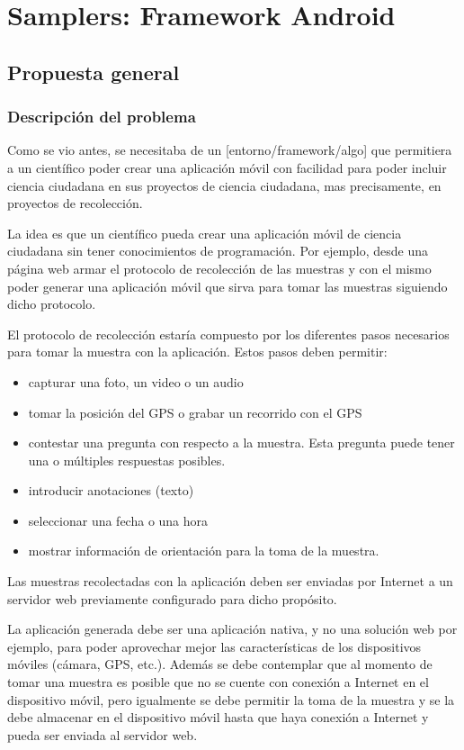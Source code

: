 \chapter{Samplers: Framework Android}

\section{Propuesta general}

\subsection{Descripción del problema}

Como se vio antes, se necesitaba de un [entorno/framework/algo] que permitiera a un científico poder crear una aplicación móvil con facilidad para poder incluir ciencia ciudadana en sus proyectos de ciencia ciudadana, mas precisamente, en proyectos de recolección.

La idea es que un científico pueda crear una aplicación móvil de ciencia ciudadana sin tener conocimientos de programación. Por ejemplo, desde una página web armar el protocolo de recolección de las muestras y con el mismo poder generar una aplicación móvil que sirva para tomar las muestras siguiendo dicho protocolo.

El protocolo de recolección estaría compuesto por los diferentes pasos necesarios para tomar la muestra con la aplicación. Estos pasos deben permitir:
\begin{itemize}
\item capturar una foto, un video o un audio
\item tomar la posición del GPS o grabar un recorrido con el GPS
\item contestar una pregunta con respecto a la muestra. Esta pregunta puede tener una o múltiples respuestas posibles.
\item introducir anotaciones (texto)
\item seleccionar una fecha o una hora
\item mostrar información de orientación para la toma de la muestra.
\end{itemize}

Las muestras recolectadas con la aplicación deben ser enviadas por Internet a un servidor web previamente configurado para dicho propósito.

La aplicación generada debe ser una aplicación nativa, y no una solución web por ejemplo, para poder aprovechar mejor las características de los dispositivos móviles (cámara, GPS, etc.). Además se debe contemplar que al momento de tomar una muestra es posible que no se cuente con conexión a Internet en el dispositivo móvil, pero igualmente se debe permitir la toma de la muestra y se la debe almacenar en el dispositivo móvil hasta que haya conexión a Internet y pueda ser enviada al servidor web.

